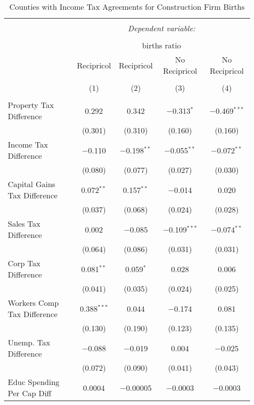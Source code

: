 
\begin{table}[!htbp] \centering 
  \caption{Counties with Income Tax Agreements for  Construction Firm Births} 
  \label{23rd} 
\begin{tabular}{@{\extracolsep{5pt}}lcccc} 
\\[-1.8ex]\hline 
\hline \\[-1.8ex] 
 & \multicolumn{4}{c}{\textit{Dependent variable:}} \\ 
\cline{2-5} 
\\[-1.8ex] & \multicolumn{4}{c}{births ratio} \\ 
 & Recipricol & Recipricol & No Recipricol & No Recipricol \\ 
\\[-1.8ex] & (1) & (2) & (3) & (4)\\ 
\hline \\[-1.8ex] 
 Property Tax Difference & 0.292 & 0.342 & $-$0.313$^{*}$ & $-$0.469$^{***}$ \\ 
  & (0.301) & (0.310) & (0.160) & (0.160) \\ 
  Income Tax Difference & $-$0.110 & $-$0.198$^{**}$ & $-$0.055$^{**}$ & $-$0.072$^{**}$ \\ 
  & (0.080) & (0.077) & (0.027) & (0.030) \\ 
  Capital Gains Tax Difference & 0.072$^{**}$ & 0.157$^{**}$ & $-$0.014 & 0.020 \\ 
  & (0.037) & (0.068) & (0.024) & (0.028) \\ 
  Sales Tax Difference & 0.002 & $-$0.085 & $-$0.109$^{***}$ & $-$0.074$^{**}$ \\ 
  & (0.064) & (0.086) & (0.031) & (0.031) \\ 
  Corp Tax Difference & 0.081$^{**}$ & 0.059$^{*}$ & 0.028 & 0.006 \\ 
  & (0.041) & (0.035) & (0.024) & (0.025) \\ 
  Workers Comp Tax Difference & 0.388$^{***}$ & 0.044 & $-$0.174 & 0.081 \\ 
  & (0.130) & (0.190) & (0.123) & (0.135) \\ 
  Unemp. Tax Difference & $-$0.088 & $-$0.019 & 0.004 & $-$0.025 \\ 
  & (0.072) & (0.090) & (0.041) & (0.043) \\ 
  Educ Spending Per Cap Diff & 0.0004 & $-$0.00005 & $-$0.0003 & $-$0.0003 \\ 

\end{tabular}
\end{table}
